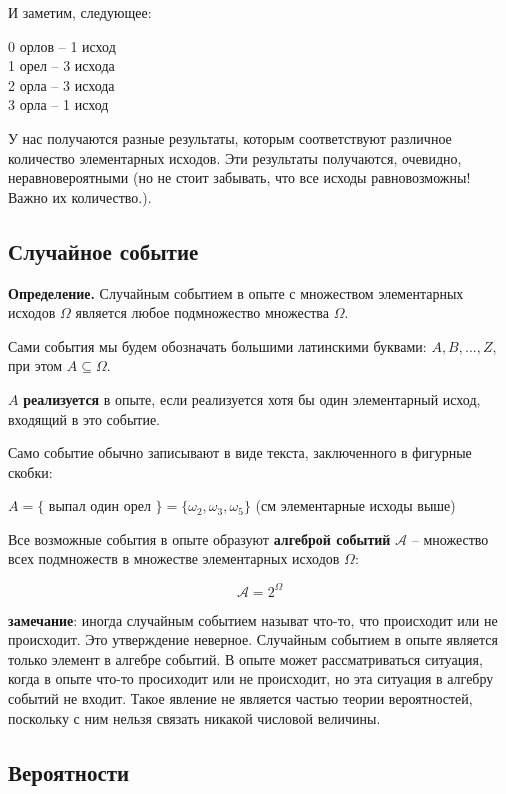 \documentclass{article}
\begin{document}
И заметим, следующее:

\begin{center}
0 орлов -- 1 исход\\
1 орел -- 3 исхода\\
2 орла -- 3 исхода\\
3 орла -- 1 исход\\
\end{center}

У нас получаются разные результаты, которым соответствуют различное количество элементарных исходов. Эти результаты получаются, очевидно, неравновероятными (но не стоит забывать, что все исходы равновозможны! Важно их количество.).

\subsection{Случайное событие}

\textbf{Определение.} Случайным событием в опыте с множеством элементарных исходов $\Omega$ является любое подмножество множества $\Omega$.

Сами события мы будем обозначать большими латинскими буквами: $A, B, ..., Z$, при этом $A \subseteq \Omega$.

$A$ \textbf{реализуется} в опыте, если реализуется хотя бы один элементарный исход, входящий в это событие.

Само событие обычно записывают в виде текста, заключенного в фигурные скобки:

$A = \{$ выпал один орел $\} = \{\omega_2, \omega_3, \omega_5\}$ (см элементарные исходы выше)

Все возможные события в опыте образуют \textbf{алгеброй событий} $\mathcal{A}$ -- множество всех подмножеств в множестве элементарных исходов $\Omega$:

$$ \mathcal{A} = 2^{\Omega} $$

\textbf{замечание}: иногда случайным событием называт что-то, что происходит или не происходит. Это утверждение неверное. Случайным событием в опыте является только элемент в алгебре событий.
В опыте может рассматриваться ситуация, когда в опыте что-то просиходит или не происходит, но эта ситуация в алгебру событий не входит. Такое явление не является частью теории вероятностей, поскольку с ним нельзя связать никакой числовой величины.

\subsection{Вероятности}
\end{document}
